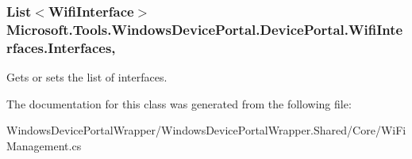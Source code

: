 \subsubsection[{\texorpdfstring{Interfaces}{Interfaces}}]{\setlength{\rightskip}{0pt plus 5cm}List$<${\bf Wifi\+Interface}$>$ Microsoft.\+Tools.\+Windows\+Device\+Portal.\+Device\+Portal.\+Wifi\+Interfaces.\+Interfaces\hspace{0.3cm}{\ttfamily [get]}, {\ttfamily [set]}}\hypertarget{class_microsoft_1_1_tools_1_1_windows_device_portal_1_1_device_portal_1_1_wifi_interfaces_ab9147c6afb5909c97c0630ce750b21e0}{}\label{class_microsoft_1_1_tools_1_1_windows_device_portal_1_1_device_portal_1_1_wifi_interfaces_ab9147c6afb5909c97c0630ce750b21e0}


Gets or sets the list of interfaces. 



The documentation for this class was generated from the following file\+:\begin{DoxyCompactItemize}
\item 
Windows\+Device\+Portal\+Wrapper/\+Windows\+Device\+Portal\+Wrapper.\+Shared/\+Core/Wi\+Fi\+Management.\+cs\end{DoxyCompactItemize}
